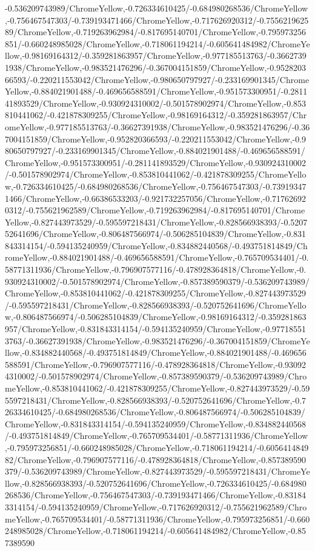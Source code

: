 {\begin{tikzternal}
-0.536209743989/ChromeYellow,-0.726334610425/-0.684980268536/ChromeYellow,-0.756467547303/-0.739193471466/ChromeYellow,-0.717626920312/-0.755621962589/ChromeYellow,-0.719263962984/-0.817695140701/ChromeYellow,-0.795973256851/-0.660248985028/ChromeYellow,-0.718061194214/-0.605641484982/ChromeYellow,-0.98169164312/-0.359281863957/ChromeYellow,-0.977185513763/-0.36627391938/ChromeYellow,-0.983521476296/-0.367004151859/ChromeYellow,-0.952820366593/-0.220211553042/ChromeYellow,-0.980650797927/-0.233169901345/ChromeYellow,-0.884021901488/-0.469656588591/ChromeYellow,-0.951573300951/-0.281141893529/ChromeYellow,-0.930924310002/-0.501578902974/ChromeYellow,-0.853810441062/-0.421878309255/ChromeYellow,-0.98169164312/-0.359281863957/ChromeYellow,-0.977185513763/-0.36627391938/ChromeYellow,-0.983521476296/-0.367004151859/ChromeYellow,-0.952820366593/-0.220211553042/ChromeYellow,-0.980650797927/-0.233169901345/ChromeYellow,-0.884021901488/-0.469656588591/ChromeYellow,-0.951573300951/-0.281141893529/ChromeYellow,-0.930924310002/-0.501578902974/ChromeYellow,-0.853810441062/-0.421878309255/ChromeYellow,-0.726334610425/-0.684980268536/ChromeYellow,-0.756467547303/-0.739193471466/ChromeYellow,-0.66386533203/-0.921732257056/ChromeYellow,-0.717626920312/-0.755621962589/ChromeYellow,-0.719263962984/-0.817695140701/ChromeYellow,-0.827443973529/-0.595597218431/ChromeYellow,-0.828566938393/-0.520752641696/ChromeYellow,-0.806487566974/-0.506285104839/ChromeYellow,-0.831843314154/-0.594135240959/ChromeYellow,-0.834882440568/-0.493751814849/ChromeYellow,-0.884021901488/-0.469656588591/ChromeYellow,-0.765709534401/-0.58771311936/ChromeYellow,-0.796907577116/-0.478928364818/ChromeYellow,-0.930924310002/-0.501578902974/ChromeYellow,-0.857389590379/-0.536209743989/ChromeYellow,-0.853810441062/-0.421878309255/ChromeYellow,-0.827443973529/-0.595597218431/ChromeYellow,-0.828566938393/-0.520752641696/ChromeYellow,-0.806487566974/-0.506285104839/ChromeYellow,-0.98169164312/-0.359281863957/ChromeYellow,-0.831843314154/-0.594135240959/ChromeYellow,-0.977185513763/-0.36627391938/ChromeYellow,-0.983521476296/-0.367004151859/ChromeYellow,-0.834882440568/-0.493751814849/ChromeYellow,-0.884021901488/-0.469656588591/ChromeYellow,-0.796907577116/-0.478928364818/ChromeYellow,-0.930924310002/-0.501578902974/ChromeYellow,-0.857389590379/-0.536209743989/ChromeYellow,-0.853810441062/-0.421878309255/ChromeYellow,-0.827443973529/-0.595597218431/ChromeYellow,-0.828566938393/-0.520752641696/ChromeYellow,-0.726334610425/-0.684980268536/ChromeYellow,-0.806487566974/-0.506285104839/ChromeYellow,-0.831843314154/-0.594135240959/ChromeYellow,-0.834882440568/-0.493751814849/ChromeYellow,-0.765709534401/-0.58771311936/ChromeYellow,-0.795973256851/-0.660248985028/ChromeYellow,-0.718061194214/-0.605641484982/ChromeYellow,-0.796907577116/-0.478928364818/ChromeYellow,-0.857389590379/-0.536209743989/ChromeYellow,-0.827443973529/-0.595597218431/ChromeYellow,-0.828566938393/-0.520752641696/ChromeYellow,-0.726334610425/-0.684980268536/ChromeYellow,-0.756467547303/-0.739193471466/ChromeYellow,-0.831843314154/-0.594135240959/ChromeYellow,-0.717626920312/-0.755621962589/ChromeYellow,-0.765709534401/-0.58771311936/ChromeYellow,-0.795973256851/-0.660248985028/ChromeYellow,-0.718061194214/-0.605641484982/ChromeYellow,-0.857389590
\end{tikzternal}}
